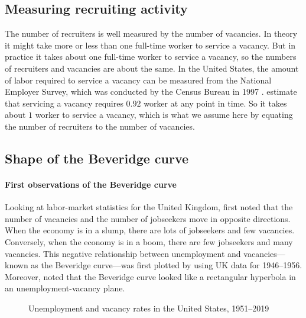 \documentclass[letterpaper,12pt,leqno]{article}
\newcommand{\pdf}{figures.pdf}
\begin{document}
\subsection{Measuring recruiting activity} 

The number of recruiters is well measured by the number of vacancies. In theory it might take more or less than one full-time worker to service a vacancy. But in practice it takes about one full-time worker to service a vacancy, so the numbers of recruiters and vacancies are about the same. In the United States, the amount of labor required to service a vacancy can be measured from the National Employer Survey, which was conducted by the Census Bureau in 1997 \citep{V10}. \citet[p. 11]{MS16} estimate that servicing a vacancy requires $0.92$ worker at any point in time. So it takes about $1$ worker to service a vacancy, which is what we assume here by equating the number of recruiters to the number of vacancies.

\subsection{Shape of the Beveridge curve}

\paragraph{First observations of the Beveridge curve} Looking at labor-market statistics for the United Kingdom, \citet{B44} first noted that the number of vacancies and the number of jobseekers move in opposite directions. When the economy is in a slump, there are lots of jobseekers and few vacancies. Conversely, when the economy is in a boom, there are few jobseekers and many vacancies. This negative relationship between unemployment and vacancies---known as the Beveridge curve---was first plotted by \citet[figures 1 and 2]{DD58} using UK data for 1946--1956. Moreover, \citet[p. 22]{DD58} noted that the Beveridge curve looked like a rectangular hyperbola in an unemployment-vacancy plane.

\begin{figure}[t]
\hfill
{}
\caption{Unemployment and vacancy rates in the United States, 1951--2019}
\label{f:1951}\end{figure}
\end{document}
